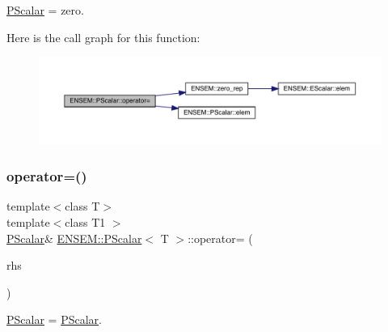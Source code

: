 \mbox{\hyperlink{classENSEM_1_1PScalar}{P\+Scalar}} = zero. 

Here is the call graph for this function\+:
\nopagebreak
\begin{figure}[H]
\begin{center}
\leavevmode
\includegraphics[width=350pt]{d3/d27/classENSEM_1_1PScalar_a4357d579e24371f6384da9008f4512b3_cgraph}
\end{center}
\end{figure}
\mbox{\label{classENSEM_1_1PScalar_ae69d6f1ad8ec0b65652f8d16c5f97b11}} 
\subsubsection{\texorpdfstring{operator=()}{operator=()}\hspace{0.1cm}{\footnotesize\ttfamily [4/6]}}
{\footnotesize\ttfamily template$<$class T$>$ \\
template$<$class T1 $>$ \\
\mbox{\hyperlink{classENSEM_1_1PScalar}{P\+Scalar}}\& \mbox{\hyperlink{classENSEM_1_1PScalar}{E\+N\+S\+E\+M\+::\+P\+Scalar}}$<$ T $>$\+::operator= (\begin{DoxyParamCaption}\item[{const \mbox{\hyperlink{classENSEM_1_1PScalar}{P\+Scalar}}$<$ T1 $>$ \&}]{rhs }\end{DoxyParamCaption})\hspace{0.3cm}{\ttfamily [inline]}}



\mbox{\hyperlink{classENSEM_1_1PScalar}{P\+Scalar}} = \mbox{\hyperlink{classENSEM_1_1PScalar}{P\+Scalar}}. 

